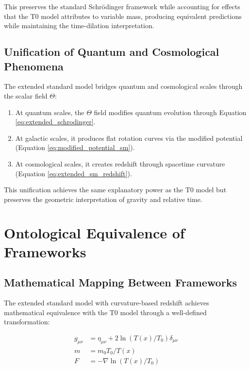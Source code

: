 \documentclass[twocolumn,aps,prl]{revtex4-2}
\begin{document}
	This preserves the standard Schrödinger framework while accounting for effects that the T0 model attributes to variable mass, producing equivalent predictions while maintaining the time-dilation interpretation.
	
	\subsection{Unification of Quantum and Cosmological Phenomena}
	\label{subsec:quantum_cosmological_unification}
	
	The extended standard model bridges quantum and cosmological scales through the scalar field \(\Theta\):
	
	\begin{enumerate}
		\item At quantum scales, the \(\Theta\) field modifies quantum evolution through Equation \ref{eq:extended_schrodinger}.
		\item At galactic scales, it produces flat rotation curves via the modified potential (Equation \ref{eq:modified_potential_sm}).
		\item At cosmological scales, it creates redshift through spacetime curvature (Equation \ref{eq:extended_sm_redshift}).
	\end{enumerate}
	
	This unification achieves the same explanatory power as the T0 model but preserves the geometric interpretation of gravity and relative time.
	
	\section{Ontological Equivalence of Frameworks}
	\label{sec:ontological_equivalence}
	
	\subsection{Mathematical Mapping Between Frameworks}
	\label{subsec:mathematical_mapping}
	
	The extended standard model with curvature-based redshift achieves mathematical equivalence with the T0 model through a well-defined transformation:
	
	\begin{equation}
		\begin{aligned}
			g_{\mu\nu} &= \eta_{\mu\nu} + 2\ln(T(x)/T_0)\delta_{\mu\nu} \\
			m &= m_0T_0/T(x) \\
			F &= -\nabla\ln(T(x)/T_0)
		\end{aligned}
		\label{eq:framework_transformation}
	\end{equation}
	
\end{document}
